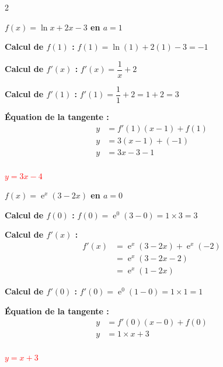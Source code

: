 \documentclass[11pt,a4paper]{article}
\DeclareMathOperator{\e}{e}
\begin{document}
\begin{multicols}{2}
\begin{tcolorbox}[colback=red!5!white,colframe=red!75!black]
{
\textbf{$f(x)= \ln x + 2x - 3$ en $a=1$}

\vspace{3mm}

\textbf{Calcul de $f(1)$ :}
$
f(1) = \ln(1) + 2(1) - 3 = -1
$

\vspace{2mm}

\textbf{Calcul de $f'(x)$ :}
$f'(x) = \dfrac{1}{x} + 2$


\vspace{2mm}

\textbf{Calcul de $f'(1)$ :}
$
f'(1) = \dfrac{1}{1} + 2 = 1 + 2 = 3
$

\vspace{2mm}

\textbf{Équation de la tangente :}
\[
\begin{aligned}
y &= f'(1)(x-1) + f(1) \\
y &= 3(x-1) + (-1) \\
y &= 3x - 3 - 1 \\
\end{aligned}
\]
\begin{center}
\textbf{\textcolor{red}{$y = 3x - 4$}}
\end{center}
}
\end{tcolorbox}

\begin{tcolorbox}[colback=red!5!white,colframe=red!75!black]
{
\textbf{$f(x)=\e^x(3-2x)$ en $a=0$}

\textbf{Calcul de $f(0)$ :}
$f(0) = \e^0(3-0) = 1 \times 3 = 3$


\vspace{2mm}

\textbf{Calcul de $f'(x)$ :}
\[
\begin{aligned}
f'(x) &= \e^x(3-2x) + \e^x(-2) \\
&= \e^x(3-2x-2) \\
&= \e^x(1-2x)
\end{aligned}
\]

\vspace{2mm}

\textbf{Calcul de $f'(0)$ :}
$f'(0) = \e^0(1-0) = 1 \times 1 = 1$


\vspace{2mm}

\textbf{Équation de la tangente :}
\[
\begin{aligned}
y &= f'(0)(x-0) + f(0) \\
y &= 1 \times x + 3 \\
\end{aligned}
\]
\begin{center}
\textbf{\textcolor{red}{$y = x + 3$}}
\end{center}
}
\end{tcolorbox}
\end{multicols}
\end{document}
